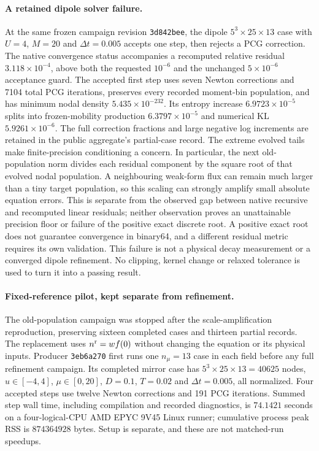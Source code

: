\documentclass[11pt,letterpaper]{article}
\begin{document}
\paragraph{A retained dipole solver failure.}
At the same frozen campaign revision \texttt{3d842bee}, the dipole
$5^3\times25\times13$ case with $U=4$, $M=20$ and $\Delta t=0.005$
accepts one step, then rejects a PCG correction. The native convergence
status accompanies a recomputed relative residual $3.118\times10^{-4}$,
above both the requested $10^{-6}$ and the unchanged $5\times10^{-6}$
acceptance guard. The accepted first step uses seven Newton corrections
and 7104 total PCG iterations, preserves every recorded moment-bin population,
and has minimum nodal density $5.435\times10^{-232}$.
Its entropy increase $6.9723\times10^{-5}$ splits into frozen-mobility
production $6.3797\times10^{-5}$ and numerical KL $5.9261\times10^{-6}$.
The full correction fractions and large negative log increments are retained
in the public aggregate's partial-case record. The extreme evolved tails
make finite-precision conditioning a concern. In particular, the next
old-population norm divides each residual component by the square root of
that evolved nodal population. A neighbouring weak-form flux can remain much
larger than a tiny target population, so this scaling can strongly amplify
small absolute equation errors. This is separate from the observed gap between
native recursive and recomputed linear residuals; neither observation proves
an unattainable precision floor or failure of the positive exact discrete root.
A positive exact root does not guarantee convergence in binary64, and a
different residual metric requires its own validation. This failure is not a physical
decay measurement or a converged dipole refinement. No clipping, kernel
change or relaxed tolerance is used to turn it into a passing result.

\paragraph{Fixed-reference pilot, kept separate from refinement.}
The old-population campaign was stopped after the scale-amplification
reproduction, preserving sixteen completed cases and thirteen partial records.
The replacement uses $n^{\rm r}=w f(0)$ without changing the equation or its
physical inputs. Producer \texttt{3eb6a270} first runs one $n_\mu=13$ case in
each field before any full refinement campaign. Its completed mirror case has
$5^3\times25\times13=40625$ nodes, $u\in[-4,4]$, $\mu\in[0,20]$,
$D=0.1$, $T=0.02$ and $\Delta t=0.005$, all normalized. Four accepted steps
use twelve Newton corrections and 191 PCG iterations. Summed step wall time,
including compilation and recorded diagnostics, is $74.1421$ seconds on a
four-logical-CPU AMD EPYC 9V45 Linux runner; cumulative process peak RSS is
$874364928$ bytes. Setup is separate, and these are not matched-run speedups.
\end{document}
